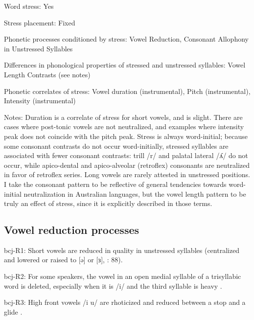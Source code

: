 {\begin{appendixdesc}
\item[Word stress:] Yes

\item[Stress placement:] Fixed

\item[Phonetic processes conditioned by stress:] Vowel Reduction, Consonant Allophony in Unstressed Syllables

\item[Differences in phonological properties of stressed and unstressed syllables:] Vowel Length Contrasts (see notes)

\item[Phonetic correlates of stress:] Vowel duration (instrumental), Pitch (instrumental), Intensity (instrumental)

\item[Notes:] Duration is a correlate of stress for short vowels, and is slight. There are cases where post-tonic vowels are not neutralized, and examples where intensity peak does not coincide with the pitch peak. Stress is always word-initial; because some consonant contrasts do not occur word-initially, stressed syllables are associated with fewer consonant contrasts: trill /r/ and palatal lateral /ʎ/ do not occur, while apico-dental and apico-alveolar (retroflex) consonants are neutralized in favor of retroflex series. Long vowels are rarely attested in unstressed positions. I take the consonant pattern to be reflective of general tendencies towards word-initial neutralization in Australian languages, but the vowel length pattern to be truly an effect of stress, since it is explicitly described in those terms.
\end{appendixdesc}
\subsection*{Vowel reduction processes}
\begin{appendixdesc}

\item[bcj-R1:] Short vowels are reduced in quality in unstressed syllables (centralized and lowered or raised to [ə] or [ɜ], \citealt{Bowern2012}: 88).

\item[bcj-R2:] For some speakers, the vowel in an open medial syllable of a trisyllabic word is deleted, especially when it is /i/ and the third syllable is heavy \citep[91]{Bowern2012}.

\item[bcj-R3:] High front vowels /i u/ are rhoticized and reduced between a stop and a glide \citep[91]{Bowern2012}.


\end{appendixdesc}}

